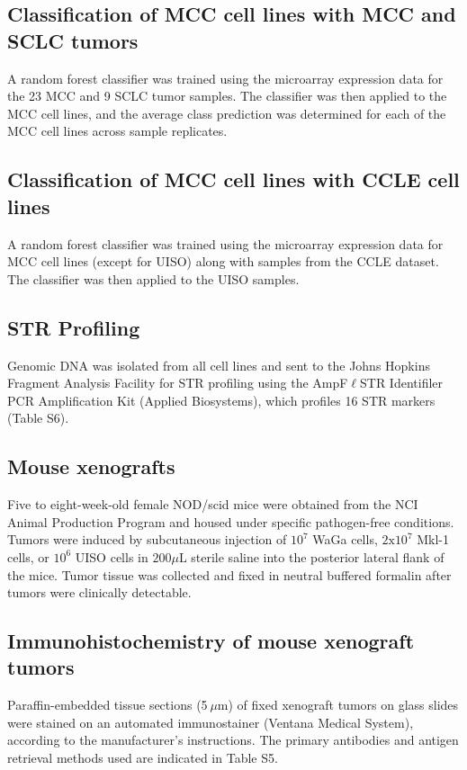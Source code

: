 \documentclass[10pt]{article}
\begin{document}
\subsection*{Classification of MCC cell lines with MCC and SCLC tumors}
A random forest classifier was trained using the microarray expression data for the 23 MCC and 9 SCLC tumor samples.
The classifier was then applied to the MCC cell lines, and the average class prediction was determined for each of the MCC cell lines across sample replicates.

\subsection*{Classification of MCC cell lines with CCLE cell lines}
A random forest classifier was trained using the  microarray expression data for MCC cell lines (except for UISO) along with samples from the CCLE dataset.
The classifier was then applied to the UISO samples.

\subsection*{STR Profiling}
Genomic DNA was isolated from all cell lines and sent to the Johns Hopkins Fragment Analysis Facility for STR profiling using the AmpF$\ell$STR Identifiler PCR Amplification Kit (Applied Biosystems), which profiles 16 STR markers (Table S6).

\subsection*{Mouse xenografts}
Five to eight-week-old female NOD/scid mice were obtained from the NCI Animal Production Program and housed under specific pathogen-free conditions.
Tumors were induced by subcutaneous injection of $10^7$ WaGa cells, $2\mathrm{x}10^7$ Mkl-1 cells, or $10^6$ UISO cells in $200\mu\mathrm{L}$ sterile saline into the posterior lateral flank of the mice.
Tumor tissue was collected and fixed in neutral buffered formalin after tumors were clinically detectable.

\subsection*{Immunohistochemistry of mouse xenograft tumors}
Paraffin-embedded tissue sections (5 $\mu\mathrm{m}$) of fixed xenograft tumors on glass slides were stained on an automated immunostainer (Ventana Medical System), according to the manufacturer's instructions.
The primary antibodies and antigen retrieval methods used are indicated in Table S5.
\end{document}
